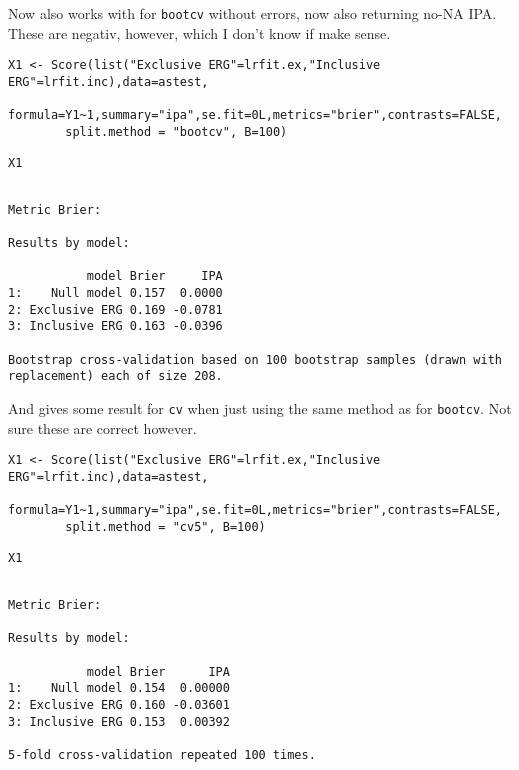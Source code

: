 \documentclass{article}
\begin{document}
Now also works with for \texttt{bootcv} without errors, now also returning no-NA IPA. These are negativ, however, which I don't know if make sense.
\lstset{language=r,label= ,caption= ,captionpos=b,numbers=none}
\begin{lstlisting}
X1 <- Score(list("Exclusive ERG"=lrfit.ex,"Inclusive ERG"=lrfit.inc),data=astest,
	    formula=Y1~1,summary="ipa",se.fit=0L,metrics="brier",contrasts=FALSE,
	    split.method = "bootcv", B=100)
\end{lstlisting}


\lstset{language=r,label= ,caption= ,captionpos=b,numbers=none}
\begin{lstlisting}
X1
\end{lstlisting}

\begin{verbatim}

Metric Brier:

Results by model:

           model Brier     IPA
1:    Null model 0.157  0.0000
2: Exclusive ERG 0.169 -0.0781
3: Inclusive ERG 0.163 -0.0396

Bootstrap cross-validation based on 100 bootstrap samples (drawn with replacement) each of size 208.
\end{verbatim}


And gives some result for \texttt{cv} when just using the same method as for \texttt{bootcv}. Not sure these are correct however.
\lstset{language=r,label= ,caption= ,captionpos=b,numbers=none}
\begin{lstlisting}
X1 <- Score(list("Exclusive ERG"=lrfit.ex,"Inclusive ERG"=lrfit.inc),data=astest,
	    formula=Y1~1,summary="ipa",se.fit=0L,metrics="brier",contrasts=FALSE,
	    split.method = "cv5", B=100)
\end{lstlisting}


\lstset{language=r,label= ,caption= ,captionpos=b,numbers=none}
\begin{lstlisting}
X1
\end{lstlisting}

\begin{verbatim}

Metric Brier:

Results by model:

           model Brier      IPA
1:    Null model 0.154  0.00000
2: Exclusive ERG 0.160 -0.03601
3: Inclusive ERG 0.153  0.00392

5-fold cross-validation repeated 100 times.
\end{verbatim}
\end{document}
